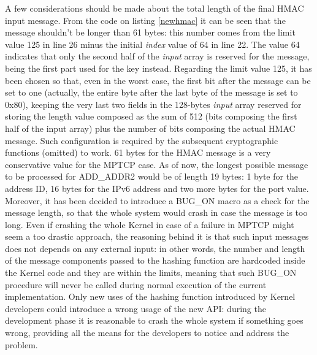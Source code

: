A few considerations should be made about the total length of the final HMAC input message. From the code on listing \ref{newhmac} it can be seen that the message shouldn't be longer than 61 bytes: this number comes from the limit value 125 in line 26 minus the initial \textit{index} value of 64 in line 22. The value 64 indicates that only the second half of the \textit{input} array is reserved for the message, being the first part used for the key instead. Regarding the limit value 125, it has been chosen so that, even in the worst case, the first bit after the message can be set to one (actually, the entire byte after the last byte of the message is set to 0x80), keeping the very last two fields in the 128-bytes \textit{input} array reserved for storing the length value composed as the sum of 512 (bits composing the first half of the input array) plus the number of bits composing the actual HMAC message. Such configuration is required by the subsequent cryptographic functions (omitted) to work.
61 bytes for the HMAC message is a very conservative value for the MPTCP case. As of now, the longest possible message to be processed for ADD\_ADDR2 would be of length 19 bytes: 1 byte for the address ID, 16 bytes for the IPv6 address and two more bytes for the port value.
Moreover, it has been decided to introduce a BUG\_ON macro as a check for the message length, so that the whole system would crash in case the message is too long. Even if crashing the whole Kernel in case of a failure in MPTCP might seem a too drastic approach, the reasoning behind it is that such input messages does not depends on any external input: in other words, the number and length of the message components passed to the hashing function are hardcoded inside the Kernel code and they are within the limits, meaning that such BUG\_ON procedure will never be called during normal execution of the current implementation. Only new uses of the hashing function introduced by Kernel developers could introduce a wrong usage of the new API: during the development phase it is reasonable to crash the whole system if something goes wrong, providing all the means for the developers to notice and address the problem.

